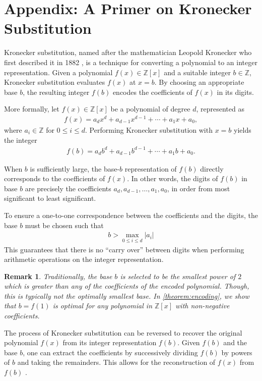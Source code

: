 \documentclass[11pt,reqno]{article}
\theoremstyle{plain}
\newtheorem{remark}{Remark}
\theoremstyle{definition}
\begin{document}
\newpage
\section{Appendix: A Primer on Kronecker Substitution} \label{section:kronecker}
Kronecker substitution, named after the mathematician Leopold Kronecker who first described it in 1882 \cite{kronecker1882}, is a technique for converting a polynomial to an integer representation. Given a polynomial $f(x) \in \mathbb{Z}[x]$ and a suitable integer $b \in \mathbb{Z}$, Kronecker substitution evaluates $f(x)$ at $x = b$. By choosing an appropriate base $b$, the resulting integer $f(b)$ encodes the coefficients of $f(x)$ in its digits.

More formally, let $f(x) \in \mathbb{Z}[x]$ be a polynomial of degree $d$, represented as
\begin{align*}
f(x) = a_d x^d + a_{d-1} x^{d-1} + \cdots + a_1 x + a_0,
\end{align*}
where $a_i \in \mathbb{Z}$ for $0 \leq i \leq d$. Performing Kronecker substitution with $x = b$ yields the integer
\begin{align*}
f(b) = a_d b^d + a_{d-1} b^{d-1} + \cdots + a_1 b + a_0.
\end{align*}

When $b$ is sufficiently large, the base-$b$ representation of $f(b)$ directly corresponds to the coefficients of $f(x)$. In other words, the digits of $f(b)$ in base $b$ are precisely the coefficients $a_d, a_{d-1}, \ldots, a_1, a_0$, in order from most significant to least significant.

To ensure a one-to-one correspondence between the coefficients and the digits, the base $b$ must be chosen such that
\begin{align*}
    b > \max_{0 \leq i \leq d} |a_i|
\end{align*}
This guarantees that there is no ``carry over'' between digits when performing arithmetic operations on the integer representation.

\begin{remark}
Traditionally, the base $b$ is selected to be the smallest power of $2$ which is greater than any of the coefficients of the encoded polynomial. Though, this is typically not the optimally smallest base. In \cref{theorem:encoding}, we show that $b=f(1)$ is optimal for any polynomial in $\mathbb{Z}[x]$ with non-negative coefficients.
\end{remark}

The process of Kronecker substitution can be reversed to recover the original polynomial $f(x)$ from its integer representation $f(b)$. Given $f(b)$ and the base $b$, one can extract the coefficients by successively dividing $f(b)$ by powers of $b$ and taking the remainders. This allows for the reconstruction of $f(x)$ from $f(b)$ \cite{grimaldi2004discrete}.
\end{document}
